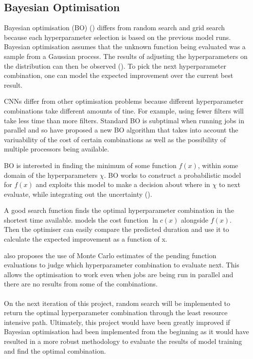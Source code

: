 \subsection{Bayesian Optimisation}
Bayesian optimisation (BO) (\cite{mockus78}) differs from random search and grid search because each hyperparameter selection is based on the previous model runs. Bayesian optimisation assumes that the unknown function being evaluated was a sample from a Gaussian process. The results of adjusting the hyperparameters on the distribution can then be observed (\cite{snoek12}). To pick the next hyperparameter combination, one can model the expected improvement over the current best result.
\par
CNNs differ from other optimisation problems because different hyperparameter combinations take different amounts of tine. For example, using fewer filters will take less time than more filters. Standard BO is subptimal when running jobs in parallel and so \citet{snoek12} have proposed a new BO algorithm that takes into account the variuability of the cost of certain combinations as well as the possibility of multiple processors being available. 
\par
BO is interested in finding the minimum of some function $f(x)$, within some domain of the hyperparameters $\chi$. BO works to construct a probabilistic model for $f(x)$ and exploits this model to make a decision about where in $\chi$ to next evaluate, while integrating out the uncertainty (\cite{brochu10, snoek12}). \par
A good search function finds the optimal hyperparameter combination in the shortest time available. \citet{snoek12} models the cost function $\ln c (x)$ alongside $f(x)$. Then the optimiser can easily compare the predicted duration and use it to calculate the expected improvement as a function of x.
\par
\citet{snoek12} also proposes the use of Monte Carlo estimates of the pending function evaluations to judge which hyperparameter combination to evaluate next. This allows the optimisation to work even when jobs are being run in parallel and there are no results from some of the combinations.
\paragraph{}
On the next iteration of this project, random search will be implemented to return the optimal hyperparameter combination through the least resource intensive path. Ultimately, this project would have been greatly improved if Bayesian optimisation had been implemented from the beginning as it would have resulted in a more robust methodology to evaluate the results of model training and find the optimal combination. 
